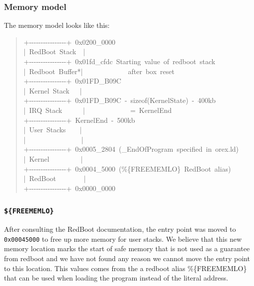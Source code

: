 \documentclass[letterpaper]{article}
\begin{document}
\subsubsection{Memory model%
  \label{memory-model}%
}

The memory model looks like this:
%
\begin{quote}{\ttfamily \raggedright \noindent
+-{}-{}-{}-{}-{}-{}-{}-{}-{}-{}-{}-{}-{}-{}-{}-+~0x0200\_0000\\
|~RedBoot~Stack~~|\\
+-{}-{}-{}-{}-{}-{}-{}-{}-{}-{}-{}-{}-{}-{}-{}-+~0x01fd\_cfdc~Starting~value~of~redboot~stack\\
|~Redboot~Buffer*|~~~~~~~~~~~~~after~box~reset\\
+-{}-{}-{}-{}-{}-{}-{}-{}-{}-{}-{}-{}-{}-{}-{}-+~0x01FD\_B09C\\
|~Kernel~Stack~~~|\\
+-{}-{}-{}-{}-{}-{}-{}-{}-{}-{}-{}-{}-{}-{}-{}-+~0x01FD\_B09C~-~sizeof(KernelState)~-~400kb\\
|~IRQ~Stack~~~~~~|~~~~~~~~~~~~~=~KernelEnd\\
+-{}-{}-{}-{}-{}-{}-{}-{}-{}-{}-{}-{}-{}-{}-{}-+~KernelEnd~-~500kb\\
|~User~Stacks~~~~|\\
|~~~~~~~~~~~~~~~~|\\
+-{}-{}-{}-{}-{}-{}-{}-{}-{}-{}-{}-{}-{}-{}-{}-+~0x0005\_2804~(\_EndOfProgram~specified~in~orex.ld)\\
|~Kernel~~~~~~~~~|\\
+-{}-{}-{}-{}-{}-{}-{}-{}-{}-{}-{}-{}-{}-{}-{}-+~0x0004\_5000~(\%\{FREEMEMLO\}~RedBoot~alias)\\
|~RedBoot~~~~~~~~|\\
+-{}-{}-{}-{}-{}-{}-{}-{}-{}-{}-{}-{}-{}-{}-{}-+~0x0000\_0000
}
\end{quote}


\subsubsection{\texttt{\$\{FREEMEMLO\}}%
  \label{freememlo}%
}

After consulting the RedBoot documentation, the entry point was moved to \texttt{0x00045000} to free up more memory for user stacks. We believe that this new memory location marks the start of safe memory that is not used as a guarantee from redboot and we have not found any reason we cannot move the entry point to this location.  This values comes from the a redboot alias \%\{FREEMEMLO\} that can be used when loading the program instead of the literal address.
\end{document}
